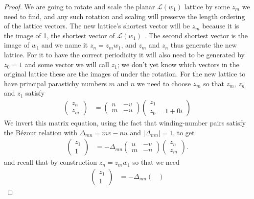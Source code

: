 \begin{proof}
 We are going to rotate and scale the planar $\mathcal{L}(w_1)$ lattice by some $z_m$ we need to find, and any such rotation and scaling  will preserve the length ordering of the lattice vectors. The new lattice's shortest vector will be  $z_m$ because it is the image of 1, the shortest vector of  $\mathcal{L}(w_1)$ . The second shortest vector is the image of $w_1$ and we name it $z_n=z_m w_1$, and $z_m$ and $z_n$ thus generate the new lattice. For it to have the correct periodicity it will also need to be  generated by $z_0=1$ and some vector we will call $z_1$; we don't yet know which vectors in the original lattice these are the images of under the rotation.  For the new lattice to have principal parastichy numbers $m$ and $n$ we need to choose $z_m$ so that $z_m$, $z_n$  and $z_1$ satisfy
	\begin{align}
		\begin{pmatrix}
			z_n \\ z_m 
		\end{pmatrix}
		&=
		\begin{pmatrix}
			n  & -v\\ m & -u
		\end{pmatrix}
		\begin{pmatrix}
			z_1 \\ z_0=1 +0i
		\end{pmatrix}
		\label{eq:zdef3}
	\end{align}
  We invert this matrix equation, using the fact that 
  winding-number pairs satisfy the B\'ezout relation with
  $\Delta_{mn}=mv-nu$ and $|\Delta_{mn}|=1$, to get
\begin{align}
\begin{pmatrix}
	z_1 \\ 1 
\end{pmatrix}
&= -\Delta_{mn} \begin{pmatrix}
	u & -v\\ m & -n
\end{pmatrix}
 \begin{pmatrix}
	z_n \\ z_m 
\end{pmatrix}.
\label{eq:zinv}
\end{align}
and recall that by construction $z_n=z_m w_1$ so that we need
\begin{align}
	\begin{pmatrix}
		z_1 \\ 1 
	\end{pmatrix}
	&= -\Delta_{mn} \begin{pmatrix}

\end{pmatrix}
\end{align}
\end{proof}
